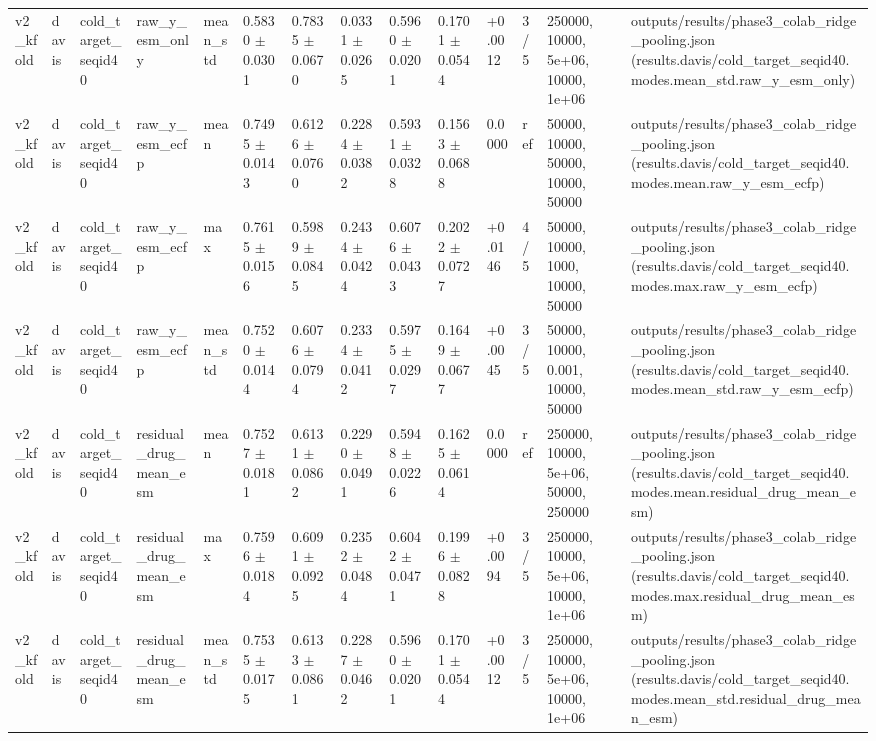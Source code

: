 \begin{table}[htbp]
\begin{tabular}{llllllllllllll}
v2\_kfold & davis & cold\_target\_seqid40 & raw\_y\_esm\_only & mean\_std & 0.5830 $\pm$ 0.0301 & 0.7835 $\pm$ 0.0670 & 0.0331 $\pm$ 0.0265 & 0.5960 $\pm$ 0.0201 & 0.1701 $\pm$ 0.0544 & +0.0012 & 3/5 & 250000, 10000, 5e+06, 10000, 1e+06 & outputs/results/phase3\_colab\_ridge\_pooling.json (results.davis/cold\_target\_seqid40.modes.mean\_std.raw\_y\_esm\_only) \\
v2\_kfold & davis & cold\_target\_seqid40 & raw\_y\_esm\_ecfp & mean & 0.7495 $\pm$ 0.0143 & 0.6126 $\pm$ 0.0760 & 0.2284 $\pm$ 0.0382 & 0.5931 $\pm$ 0.0328 & 0.1563 $\pm$ 0.0688 & 0.0000 & ref & 50000, 10000, 50000, 10000, 50000 & outputs/results/phase3\_colab\_ridge\_pooling.json (results.davis/cold\_target\_seqid40.modes.mean.raw\_y\_esm\_ecfp) \\
v2\_kfold & davis & cold\_target\_seqid40 & raw\_y\_esm\_ecfp & max & 0.7615 $\pm$ 0.0156 & 0.5989 $\pm$ 0.0845 & 0.2434 $\pm$ 0.0424 & 0.6076 $\pm$ 0.0433 & 0.2022 $\pm$ 0.0727 & +0.0146 & 4/5 & 50000, 10000, 1000, 10000, 50000 & outputs/results/phase3\_colab\_ridge\_pooling.json (results.davis/cold\_target\_seqid40.modes.max.raw\_y\_esm\_ecfp) \\
v2\_kfold & davis & cold\_target\_seqid40 & raw\_y\_esm\_ecfp & mean\_std & 0.7520 $\pm$ 0.0144 & 0.6076 $\pm$ 0.0794 & 0.2334 $\pm$ 0.0412 & 0.5975 $\pm$ 0.0297 & 0.1649 $\pm$ 0.0677 & +0.0045 & 3/5 & 50000, 10000, 0.001, 10000, 50000 & outputs/results/phase3\_colab\_ridge\_pooling.json (results.davis/cold\_target\_seqid40.modes.mean\_std.raw\_y\_esm\_ecfp) \\
v2\_kfold & davis & cold\_target\_seqid40 & residual\_drug\_mean\_esm & mean & 0.7527 $\pm$ 0.0181 & 0.6131 $\pm$ 0.0862 & 0.2290 $\pm$ 0.0491 & 0.5948 $\pm$ 0.0226 & 0.1625 $\pm$ 0.0614 & 0.0000 & ref & 250000, 10000, 5e+06, 50000, 250000 & outputs/results/phase3\_colab\_ridge\_pooling.json (results.davis/cold\_target\_seqid40.modes.mean.residual\_drug\_mean\_esm) \\
v2\_kfold & davis & cold\_target\_seqid40 & residual\_drug\_mean\_esm & max & 0.7596 $\pm$ 0.0184 & 0.6091 $\pm$ 0.0925 & 0.2352 $\pm$ 0.0484 & 0.6042 $\pm$ 0.0471 & 0.1996 $\pm$ 0.0828 & +0.0094 & 3/5 & 250000, 10000, 5e+06, 10000, 1e+06 & outputs/results/phase3\_colab\_ridge\_pooling.json (results.davis/cold\_target\_seqid40.modes.max.residual\_drug\_mean\_esm) \\
v2\_kfold & davis & cold\_target\_seqid40 & residual\_drug\_mean\_esm & mean\_std & 0.7535 $\pm$ 0.0175 & 0.6133 $\pm$ 0.0861 & 0.2287 $\pm$ 0.0462 & 0.5960 $\pm$ 0.0201 & 0.1701 $\pm$ 0.0544 & +0.0012 & 3/5 & 250000, 10000, 5e+06, 10000, 1e+06 & outputs/results/phase3\_colab\_ridge\_pooling.json (results.davis/cold\_target\_seqid40.modes.mean\_std.residual\_drug\_mean\_esm) \\

\end{tabular}
\end{table}
